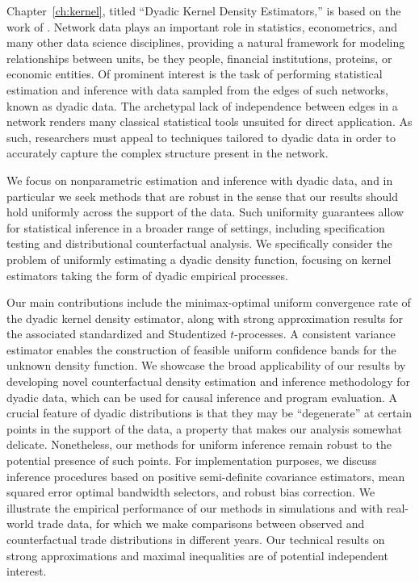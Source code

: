 \documentclass[11pt,lof]{puthesis}
\theoremstyle{break}
\theoremstyle{proof}
\begin{document}
Chapter~\ref{ch:kernel}, titled ``Dyadic Kernel Density Estimators,'' is based
on the work of \citet{cattaneo2024uniform}. Network data plays an important role
in statistics, econometrics, and many other data science disciplines, providing
a natural framework for modeling relationships between units, be they people,
financial institutions, proteins, or economic entities. Of prominent interest
is the task of performing statistical estimation and inference with data
sampled from the edges of such networks, known as dyadic data. The archetypal
lack of independence between edges in a network renders many classical
statistical tools unsuited for direct application. As such, researchers must
appeal to techniques tailored to dyadic data in order to accurately capture the
complex structure present in the network.

We focus on nonparametric estimation and inference with dyadic
data, and in particular we seek methods that are robust in the sense that our
results should hold uniformly across the support of the data. Such uniformity
guarantees allow for statistical inference in a broader range of settings,
including specification testing and distributional counterfactual analysis. We
specifically consider the problem of uniformly estimating a dyadic
density function, focusing on kernel estimators taking the form of dyadic
empirical processes.

Our main contributions include the minimax-optimal uniform convergence rate of
the dyadic kernel density estimator, along with strong approximation results
for the associated standardized and Studentized $t$-processes. A consistent
variance estimator enables the construction of feasible uniform
confidence bands for the unknown density function. We showcase the broad
applicability of our results by developing novel counterfactual density
estimation and inference methodology for dyadic data, which can be used for
causal inference and program evaluation.
A crucial feature of dyadic distributions is that they may be ``degenerate'' at
certain points in the support of the data, a property that makes our analysis
somewhat delicate. Nonetheless, our methods for uniform inference remain robust
to the potential presence of such points.
For implementation purposes, we discuss inference procedures based on positive
semi-definite covariance estimators, mean squared error optimal bandwidth
selectors, and robust bias correction. We illustrate the empirical
performance of our methods in simulations and with
real-world trade data, for which we make comparisons between observed and
counterfactual trade distributions in different years. Our technical results
on strong approximations and maximal inequalities are of potential
independent interest.
\end{document}
